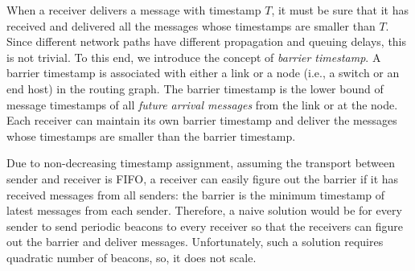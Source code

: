 When a receiver delivers a message with timestamp $T$, it must be sure that it has received and delivered all the messages whose timestamps are smaller than $T$.
Since different network paths have different propagation and queuing delays, this is not trivial.
To this end, we introduce the concept of \emph{barrier timestamp}.
A barrier timestamp is associated with either a link or a node (i.e., a switch or an end host) in the routing graph.
The barrier timestamp is the lower bound of message timestamps of all \emph{future arrival messages} from the link or at the node.
Each receiver can maintain its own barrier timestamp and deliver the messages whose timestamps are smaller than the barrier timestamp.

Due to non-decreasing timestamp assignment, assuming the transport between sender and receiver is FIFO, a receiver can easily figure out the barrier if it has received messages from all senders: the barrier is the minimum timestamp of latest messages from each sender. Therefore, a naive solution would be for every sender to send periodic beacons to every receiver so that the receivers can figure out the barrier and deliver messages. Unfortunately, such a solution requires quadratic number of beacons, so, it does not scale.





